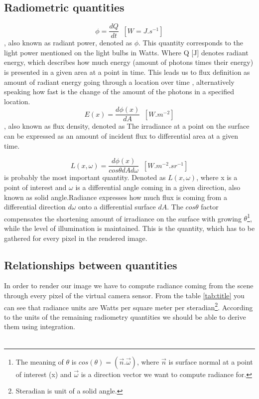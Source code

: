 \subsection{Radiometric quantities}
\begin{equation}
\phi=\frac{dQ}{dt}\;\;[W=J.s^{-1}]
\end{equation}
, also known as radiant power, denoted as $\phi$. This quantity corresponds to the light power mentioned on the light bulbs in Watts.
Where Q [J] denotes radiant energy, which describes how much energy (amount of photons times their energy) is presented in a given area at a point in time. This leads us to flux definition as  amount of radiant energy going through a location over time , alternatively speaking how fast is the change of the amount of the photons in a specified location. 
\\
\begin{equation}
E(x)=\frac{d\phi(x)}{dA}\;\;[W.m^{-2}]
\end{equation}
, also known as flux density, denoted as  The irradiance at a point  on the surface  can be expressed as an amount of incident flux to differential area at a given time.

\begin{equation}
\label{eg:rd}
L(x,\omega)=\frac{d\phi(x)}{cos\theta dAd \omega}\;\;[W.m^{-2}.sr^{-1}]
\end{equation}
 is probably the most important quantity. Denoted as $L(x,\omega)$, where x is a point of interest and $\omega$ is a differential angle coming in a given direction, also known as solid angle.Radiance expresses how much flux is coming from a differential direction $d\omega$ onto a differential surface $dA$. The $cos\theta$ factor compensates the shortening amount of irradiance on the surface with growing $\theta$\footnote{The meaning of $\theta$ is $cos(\theta)=(\vec{n}.\vec{\omega})$, where $\vec{n}$ is surface normal at a point of interest (x) and $\vec{\omega}$ is a direction vector we want to compute radiance for.}, while the level of illumination is maintained. This is the quantity, which has to be gathered for every pixel in the rendered image.

\subsection{Relationships between quantities}
In order to render our image we have to compute radiance coming from the scene through every pixel of the virtual camera sensor. From the table \ref{tab:title} you can see that radiance units are Watts per square meter per steradian\footnote{Steradian is unit of a solid angle.}. According to the units of the remaining radiometry quantities we should be able to derive them using integration.\\
\\

